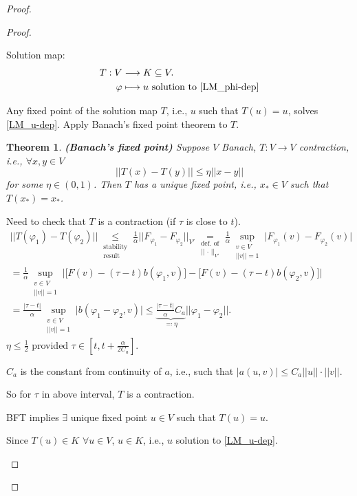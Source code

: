 \documentclass[12pt]{article}
\newtheorem*{theorem*}{Theorem}
\theoremstyle{definition}
\begin{document}
\begin{proof}
\begin{proof}
\begin{enumerate}[label=(\arabic*)]
Solution map:
\begin{align*}
T:V&\longrightarrow K\subseteq V.\\
\varphi&\longmapsto u\text{ solution to \eqref{LM_phi-dep}}
\end{align*}

Any fixed point of the solution map $T$, i.e., $u$ such that $T(u)=u$, solves \eqref{LM_u-dep}. Apply Banach's fixed point theorem to $T$.

\begin{theorem*}
\emph{\textbf{(Banach's fixed point)}} Suppose $V$ Banach, $T:V\rightarrow V$ contraction, i.e., $\forall x,y\in V$
\[\big|\big|T(x)-T(y)\big|\big|\leq\eta||x-y||\]
for some $\eta\in(0,1)$. Then $T$ has a unique fixed point, i.e., $x_*\in V$ such that $T(x_*)=x_*$.
\end{theorem*}

Need to check that $T$ is a contraction (if $\tau$ is close to $t$).
\begin{multline*}
\big|\big|T(\varphi_1)-T(\varphi_2)\big|\big|\underset{\substack{\text{stability}\\\text{result}}}\leq\frac1\alpha||F_{\varphi_1}-F_{\varphi_2}||_{V'}\underset{\substack{\text{def. of}\\||\,\cdot\,||_{V'}}}=\frac1\alpha\sup_{\substack{v\in V\\||v||=1}}\big|F_{\varphi_1}(v)-F_{\varphi_2}(v)\big|\\
=\frac1\alpha\sup_{\substack{v\in V\\||v||=1}}\Big|\big[F(v)-(\tau-t)b(\varphi_1,v)\big]-\big[F(v)-(\tau-t)b(\varphi_2,v)\big]\Big|\\
=\frac{|\tau-t|}\alpha\sup_{\substack{v\in V\\||v||=1}}\big|b(\varphi_1-\varphi_2,v)\big|\leq\underbrace{\frac{|\tau-t|}\alpha C_a}_{\eqqcolon\eta}||\varphi_1-\varphi_2||.
\end{multline*}
$\eta\leq\frac12$ provided $\tau\in[t,t+\frac\alpha{2C_a}]$.

$C_a$ is the constant from continuity of $a$, i.e., such that $|a(u,v)|\leq C_a||u||\cdot||v||$.

So for $\tau$ in above interval, $T$ is a contraction.

BFT implies $\exists$ unique fixed point $u\in V$ such that $T(u)=u$.

Since $T(u)\in K$ $\forall u\in V$, $u\in K$, i.e., $u$ solution to \eqref{LM_u-dep}.
\end{enumerate}
\end{proof}
\end{proof}
\end{document}
